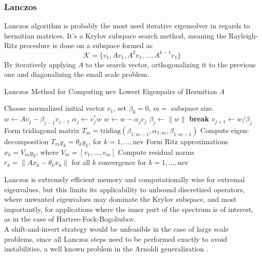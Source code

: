 \subsubsection{Lanczos}
Lanczos algorithm \cite{lanczos1952solution} is probably the most used iterative eigensolver in regards to hermitian matrices. It's a Krylov subspace search method, meaning the Rayleigh-Ritz procedure is done on a subspace formed as 
\begin{equation}
    \mathcal K = \{ v_1, Av_1, A^2 v_1, \ldots, A^{k-1} v_1 \}
\end{equation}
By iteratively applying $A$ to the search vector, orthogonalizing it to the previous one and diagonalizing the small scale problem.
\begin{algorithm}[H]
\caption{Lanczos Method for Computing nev Lowest Eigenpairs of Hermitian $A$}
\begin{algorithmic}[1]
\STATE Choose normalized initial vector $v_1$, set $\beta_0 = 0$, $m=$ subspace size.
\REPEAT
{}
    \STATE $w \gets A v_j - \beta_{j-1} v_{j-1}$
    \STATE $\alpha_j \gets v_j^* w$
    \STATE $w \gets w - \alpha_j v_j$
    \STATE $\beta_j \gets \|w\|$
        \STATE \textbf{break}
    \ENDIF
    \STATE $v_{j+1} \gets w / \beta_j$
\ENDFOR
\STATE Form tridiagonal matrix 
       $T_m = \mathrm{tridiag}(\beta_{1:m-1}, \alpha_{1:m}, \beta_{1:m-1})$
\STATE Compute eigen-decomposition $T_m y_k = \theta_k y_k$, 
       for $k = 1, \dots, \text{nev}$
\STATE Form Ritz approximations 
       $x_k = V_m y_k$, where $V_m = [v_1, \dots, v_m]$
\STATE Compute residual norms 
       $r_k = \|A x_k - \theta_k x_k\|$ for all $k$
\UNTIL convergence for $k = 1, \dots, \text{nev}$
\end{algorithmic}
\end{algorithm}
Lanczos is extremely efficient memory and computationally wise for extremal eigenvalues, but this limits its applicability to unbound discretized operators, where unwanted eigenvalues may dominate the Krylov subspace, and most importantly, for applications where the inner part of the spectrum is of interest, as in the case of Hartree-Fock-Bogoliubov.
\\A shift-and-invert strategy would be unfeasible in the case of large scale problems, since all Lanczos steps need to be performed exactly to avoid instabilities, a well known problem in the Arnoldi generalization \cite{Saad1992}.
